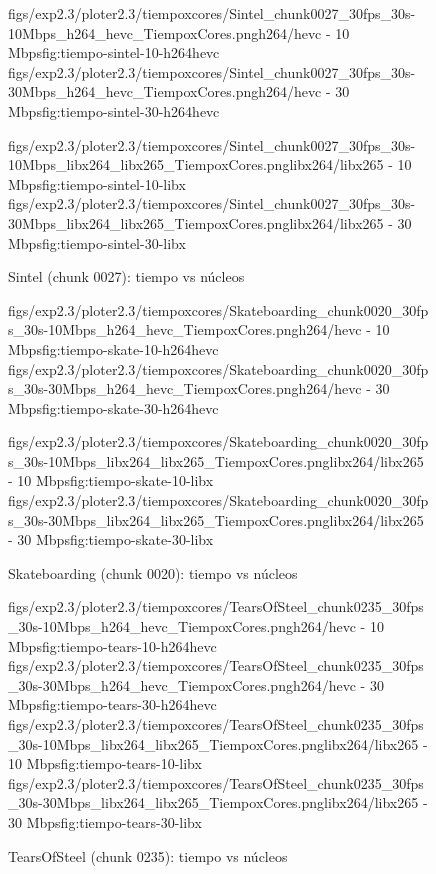 \begin{figure}[H]
  \centering
  \small
  \dosubfigs
    {figs/exp2.3/ploter2.3/tiempoxcores/Sintel_chunk0027_30fps_30s-10Mbps_h264_hevc_TiempoxCores.png}{h264/hevc - 10 Mbps}{fig:tiempo-sintel-10-h264hevc}
    {figs/exp2.3/ploter2.3/tiempoxcores/Sintel_chunk0027_30fps_30s-30Mbps_h264_hevc_TiempoxCores.png}{h264/hevc - 30 Mbps}{fig:tiempo-sintel-30-h264hevc}
  
  \dosubfigs
    {figs/exp2.3/ploter2.3/tiempoxcores/Sintel_chunk0027_30fps_30s-10Mbps_libx264_libx265_TiempoxCores.png}{libx264/libx265 - 10 Mbps}{fig:tiempo-sintel-10-libx}
    {figs/exp2.3/ploter2.3/tiempoxcores/Sintel_chunk0027_30fps_30s-30Mbps_libx264_libx265_TiempoxCores.png}{libx264/libx265 - 30 Mbps}{fig:tiempo-sintel-30-libx}
  \caption{Sintel (chunk 0027): tiempo vs núcleos}
  \label{fig:tiempo-sintel}
\end{figure}

\begin{figure}[H]
  \centering
  \small
  \dosubfigs
    {figs/exp2.3/ploter2.3/tiempoxcores/Skateboarding_chunk0020_30fps_30s-10Mbps_h264_hevc_TiempoxCores.png}{h264/hevc - 10 Mbps}{fig:tiempo-skate-10-h264hevc}
    {figs/exp2.3/ploter2.3/tiempoxcores/Skateboarding_chunk0020_30fps_30s-30Mbps_h264_hevc_TiempoxCores.png}{h264/hevc - 30 Mbps}{fig:tiempo-skate-30-h264hevc}
  
  \dosubfigs
    {figs/exp2.3/ploter2.3/tiempoxcores/Skateboarding_chunk0020_30fps_30s-10Mbps_libx264_libx265_TiempoxCores.png}{libx264/libx265 - 10 Mbps}{fig:tiempo-skate-10-libx}
    {figs/exp2.3/ploter2.3/tiempoxcores/Skateboarding_chunk0020_30fps_30s-30Mbps_libx264_libx265_TiempoxCores.png}{libx264/libx265 - 30 Mbps}{fig:tiempo-skate-30-libx}
  \caption{Skateboarding (chunk 0020): tiempo vs núcleos}
  \label{fig:tiempo-skate}
\end{figure}

\begin{figure}[H]
  \centering
  \small
  \dosubfigs
    {figs/exp2.3/ploter2.3/tiempoxcores/TearsOfSteel_chunk0235_30fps_30s-10Mbps_h264_hevc_TiempoxCores.png}{h264/hevc - 10 Mbps}{fig:tiempo-tears-10-h264hevc}
    {figs/exp2.3/ploter2.3/tiempoxcores/TearsOfSteel_chunk0235_30fps_30s-30Mbps_h264_hevc_TiempoxCores.png}{h264/hevc - 30 Mbps}{fig:tiempo-tears-30-h264hevc}
  \dosubfigs
    {figs/exp2.3/ploter2.3/tiempoxcores/TearsOfSteel_chunk0235_30fps_30s-10Mbps_libx264_libx265_TiempoxCores.png}{libx264/libx265 - 10 Mbps}{fig:tiempo-tears-10-libx}
    {figs/exp2.3/ploter2.3/tiempoxcores/TearsOfSteel_chunk0235_30fps_30s-30Mbps_libx264_libx265_TiempoxCores.png}{libx264/libx265 - 30 Mbps}{fig:tiempo-tears-30-libx}
  \caption{TearsOfSteel (chunk 0235): tiempo vs núcleos}
  \label{fig:tiempo-tears}
\end{figure}

